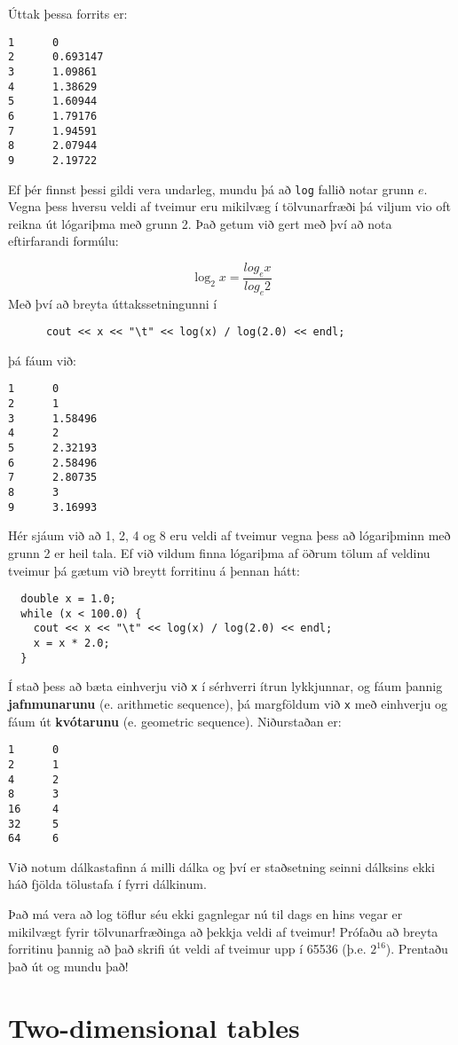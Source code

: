 Úttak þessa forrits er:

\begin{verbatim}
1      0
2      0.693147
3      1.09861
4      1.38629
5      1.60944
6      1.79176
7      1.94591
8      2.07944
9      2.19722
\end{verbatim}
%
Ef þér finnst þessi gildi vera undarleg, mundu þá að {\tt log} fallið notar grunn $e$.
Vegna þess hversu veldi af tveimur eru mikilvæg í tölvunarfræði þá viljum vio oft reikna út lógariþma með grunn 2.
Það getum við gert með því að nota eftirfarandi formúlu:

\[ \log_2 x = \frac {log_e x}{log_e 2} \]
%
Með því að breyta úttakssetningunni í 

\begin{verbatim}
      cout << x << "\t" << log(x) / log(2.0) << endl;
\end{verbatim}
%
þá fáum við:

\begin{verbatim}
1      0
2      1
3      1.58496
4      2
5      2.32193
6      2.58496
7      2.80735
8      3
9      3.16993
\end{verbatim}
%
Hér sjáum við að 1, 2, 4 og 8 eru veldi af tveimur vegna þess að lógariþminn með grunn 2 er heil tala.
Ef við vildum finna lógariþma af öðrum tölum af veldinu tveimur þá gætum við breytt forritinu á þennan hátt:

\begin{verbatim}
  double x = 1.0;
  while (x < 100.0) {
    cout << x << "\t" << log(x) / log(2.0) << endl;
    x = x * 2.0;
  }
\end{verbatim}
%
Í stað þess að bæta einhverju við {\tt x} í sérhverri ítrun lykkjunnar, og fáum þannig {\bf jafnmunarunu} (e. arithmetic sequence),
þá margföldum við {\tt x} með einhverju og fáum út {\bf kvótarunu} (e. geometric sequence).
Niðurstaðan er:

\begin{verbatim}
1      0
2      1
4      2
8      3
16     4
32     5
64     6
\end{verbatim}
%
Við notum dálkastafinn á milli dálka og því er staðsetning seinni dálksins ekki háð fjölda tölustafa í fyrri dálkinum.

Það má vera að log töflur séu ekki gagnlegar nú til dags en hins vegar er mikilvægt fyrir tölvunarfræðinga að þekkja veldi af tveimur!
Prófaðu að breyta forritinu þannig að það skrifi út veldi af tveimur upp í 65536 (þ.e. $2^{16}$).
Prentaðu það út og mundu það!


\section{Two-dimensional tables}

